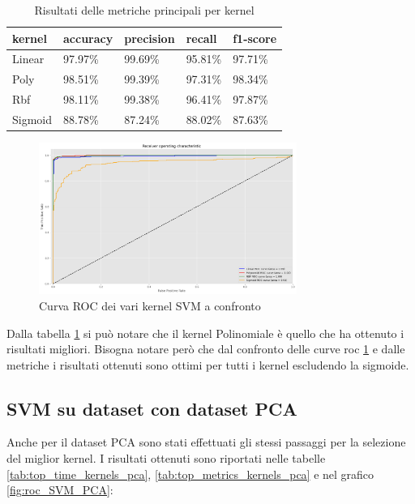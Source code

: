     \begin{table}[!ht]
        \centering
        \begin{tabular}{|l|l|l|l|l|}
        \hline
            \textbf{kernel} & \textbf{accuracy} & \textbf{precision} & \textbf{recall} & \textbf{f1-score} \\ \hline
            Linear & 97.97\% & 99.69\% & 95.81\% & 97.71\%  \\ \hline
            Poly & 98.51\% & 99.39\% & 97.31\% & 98.34\%  \\ \hline
            Rbf & 98.11\% & 99.38\% & 96.41\% & 97.87\%  \\ \hline
            Sigmoid & 88.78\% & 87.24\% & 88.02\% & 87.63\%  \\ \hline
        \end{tabular}
        \caption{Risultati delle metriche principali per kernel}
        \label{tab:top_metrics_kernels_corr}
    \end{table}

    \begin{figure}[!ht]
        \centering
        \includegraphics[width=0.75\textwidth]{img/svm/roc_SVM.png}
        \caption{Curva ROC dei vari kernel SVM a confronto}
        \label{fig:roc_SVM_corr}
    \end{figure}

    \newpage

    Dalla tabella \ref{tab:top_metrics_kernels_corr} si può notare che il kernel Polinomiale
    è quello che ha ottenuto i risultati migliori. 
    Bisogna notare però che dal confronto delle curve roc \ref{fig:roc_SVM_corr} e 
    dalle metriche i risultati ottenuti sono ottimi per tutti
    i kernel escludendo la sigmoide.

    
\subsection{SVM su dataset con dataset PCA}
Anche per il dataset PCA sono stati effettuati gli stessi passaggi per la
selezione del miglior kernel. I risultati ottenuti sono riportati nelle tabelle
\ref{tab:top_time_kernels_pca}, \ref{tab:top_metrics_kernels_pca} e nel grafico
\ref{fig:roc_SVM_PCA}:

